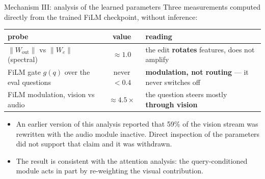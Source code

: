\documentclass[aspectratio=169,11pt]{beamer}
\begin{document}
\begin{frame}{Mechanism III: analysis of the learned parameters}
{\footnotesize Three measurements computed directly from the trained FiLM checkpoint, without inference:}
\vspace{0.3em}
\centering
\renewcommand{\arraystretch}{1.3}
\footnotesize
\begin{tabular}{l c l}
\toprule
probe & value & reading \\
\midrule
$\|W_{\text{out}}\|$ vs $\|W_e\|$ (spectral) & $\approx 1.0$ & the edit \textbf{rotates} features, does not amplify \\
FiLM gate $g(q)$ over the eval questions & never $<0.4$ & \textbf{modulation, not routing} --- it never switches off \\
FiLM modulation, vision vs audio & $\approx 4.5\times$ & the question steers mostly \textbf{through vision} \\
\bottomrule
\end{tabular}
\vfill
\begin{itemize}\footnotesize
\item An earlier version of this analysis reported that 59\% of the vision stream was rewritten with
the audio module inactive. Direct inspection of the parameters did not support that claim and it was
withdrawn.
\item The result is consistent with the attention analysis: the query-conditioned module acts in part
by re-weighting the visual contribution.
\end{itemize}
\end{frame}
\end{document}
